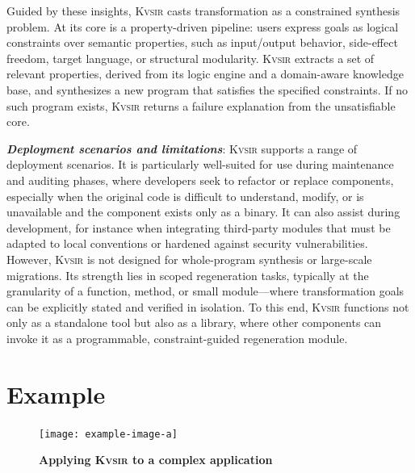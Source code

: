 \documentclass[sigplan,review,anonymous,10pt]{acmart}
\newcommand{\sys}{{\scshape Kv{\textalpha}sir}\xspace}
\newcommand{\heading}[1]{\vspace{2pt}\noindent\textbf{\emph{#1}}:\enspace}
\begin{document}
Guided by these insights, \sys casts transformation as a constrained synthesis problem.
At its core is a property-driven pipeline: users express goals as logical constraints over semantic properties, such as input/output behavior, side-effect freedom, target language, or structural modularity.
\sys extracts a set of relevant properties, derived from its logic engine and a domain-aware knowledge base, and synthesizes a new program that satisfies the specified constraints.
If no such program exists, \sys returns a failure explanation from the unsatisfiable core.

\heading{Deployment scenarios and limitations}
\sys supports a range of deployment scenarios.
It is particularly well-suited for use during maintenance and auditing phases, where developers seek to refactor or replace components, especially when the original code is difficult to understand, modify, or is unavailable and the component exists only as a binary.
It can also assist during development, for instance when integrating third-party modules that must be adapted to local conventions or hardened against security vulnerabilities.
However, \sys is not designed for whole-program synthesis or large-scale migrations.
Its strength lies in scoped regeneration tasks, typically at the granularity of a function, method, or small module---where transformation goals can be explicitly stated and verified in isolation.
To this end, \sys functions not only as a standalone tool but also as a
library, where other components can invoke it as a programmable,
constraint-guided regeneration module.


\section{Example}
\label{sec:example}

\begin{figure}[t]
\centering
  \texttt{[image: example-image-a]}
  \caption{\textbf{Applying \sys to a complex application}}
  \label{fig:ex-large-app}
\end{figure}
\end{document}
